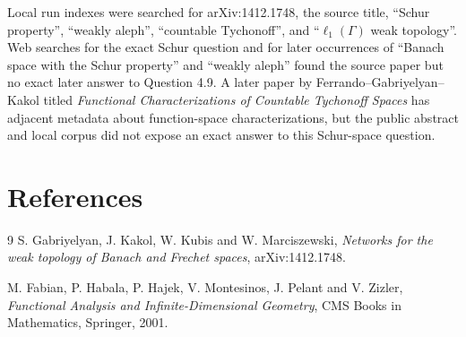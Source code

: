 \documentclass[11pt]{article}
\begin{document}
Local run indexes were searched for arXiv:1412.1748, the source title,
``Schur property'', ``weakly aleph'', ``countable Tychonoff'', and
``\(\ell_1(\Gamma)\) weak topology''.  Web searches for the exact Schur
question and for later occurrences of ``Banach space with the Schur property''
and ``weakly aleph'' found the source paper but no exact later answer to
Question 4.9.  A later paper by Ferrando--Gabriyelyan--Kakol titled
\emph{Functional Characterizations of Countable Tychonoff Spaces} has adjacent
metadata about function-space characterizations, but the public abstract and
local corpus did not expose an exact answer to this Schur-space question.

\section*{References}

\begin{thebibliography}{9}
S. Gabriyelyan, J. Kakol, W. Kubis and W. Marciszewski,
\emph{Networks for the weak topology of Banach and Frechet spaces},
arXiv:1412.1748.

M. Fabian, P. Habala, P. Hajek, V. Montesinos, J. Pelant and V. Zizler,
\emph{Functional Analysis and Infinite-Dimensional Geometry},
CMS Books in Mathematics, Springer, 2001.
\end{thebibliography}
\end{document}
